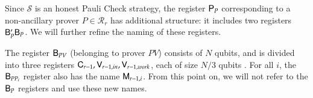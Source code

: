 Since $\mathcal{S}$ is an honest Pauli Check strategy, the register ${\mathsf{P}}_P$ corresponding to a non-ancillary prover $P \in \mathcal{R}_r$ has additional structure: it includes two registers ${\mathsf{B}}_P' {\mathsf{B}}_P$. We will further refine the naming of these registers.

The register ${\mathsf{B}}_{PV}$ (belonging to prover $PV$) consists of $N$ qubits, and is divided into three registers ${\mathsf{C}}_{r-1}, {\mathsf{V}}_{r-1,in}, {\mathsf{V}}_{r-1,work}$, each of size $N/3$ qubits . 
For all $i$, the ${\mathsf{B}}_{PP_i}$ register also has the name ${\mathsf{M}}_{r-1,i}$. From this point on, we will not refer to the ${\mathsf{B}}_P$ registers and use these new names.


